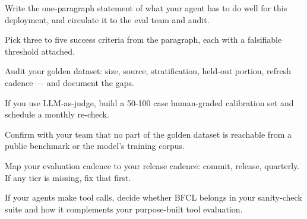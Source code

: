 \begin{TNchecklist}
\item Write the one-paragraph statement of what your agent has to do well for this deployment, and circulate it to the eval team and audit.
\item Pick three to five success criteria from the paragraph, each with a falsifiable threshold attached.
\item Audit your golden dataset: size, source, stratification, held-out portion, refresh cadence --- and document the gaps.
\item If you use LLM-as-judge, build a 50-100 case human-graded calibration set and schedule a monthly re-check.
\item Confirm with your team that no part of the golden dataset is reachable from a public benchmark or the model's training corpus.
\item Map your evaluation cadence to your release cadence: commit, release, quarterly. If any tier is missing, fix that first.
\item If your agents make tool calls, decide whether BFCL belongs in your sanity-check suite and how it complements your purpose-built tool evaluation.
\end{TNchecklist}



